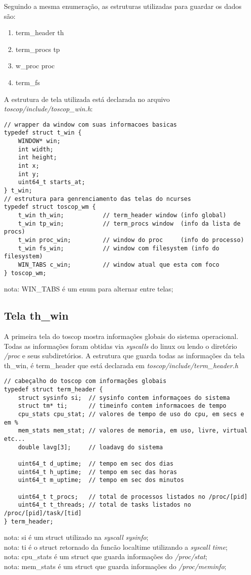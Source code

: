 \documentclass{article}
\begin{document}
Seguindo a mesma enumeração, as estruturas utilizadas para guardar os dados são:
\begin{enumerate}
    \item term\_header th 
    \item term\_procs tp
    \item w\_proc proc
    \item term\_fs
\end{enumerate}
A estrutura de tela utilizada está declarada no arquivo 
\textit{toscop/include/toscop\_win.h}:
\begin{verbatim}
// wrapper da window com suas informacoes basicas
typedef struct t_win {
    WINDOW* win;
    int width;
    int height;
    int x;
    int y;
    uint64_t starts_at;
} t_win;
// estrutura para genrenciamento das telas do ncurses
typedef struct toscop_wm {
    t_win th_win;           // term_header window (info global)
    t_win tp_win;           // term_procs window  (info da lista de procs)
    t_win proc_win;         // window do proc     (info do processo)
    t_win fs_win;           // window com filesystem (info do filesystem) 
    WIN_TABS c_win;         // window atual que esta com foco
} toscop_wm;
\end{verbatim}
nota: WIN\_TABS é um enum para alternar entre telas;

\subsection{Tela th\_win}
A primeira tela do toscop mostra informações globais do sistema 
operacional. Todas as informações foram obtidas via \textit{syscalls}
do linux ou lendo o diretório \textit{/proc} e seus subdiretórios. A 
estrutura que guarda todas as informações da tela th\_win, é term\_header
que está declarada em \textit{toscop/include/term\_header.h} 

\begin{verbatim}
// cabeçalho do toscop com informações globais
typedef struct term_header {
    struct sysinfo si;  // sysinfo contem informaçoes do sistema
    struct tm* ti;      // timeinfo contem informacoes de tempo
    cpu_stats cpu_stat; // valores de tempo de uso do cpu, em secs e em %
    mem_stats mem_stat; // valores de memoria, em uso, livre, virtual etc...
    double lavg[3];     // loadavg do sistema

    uint64_t d_uptime;  // tempo em sec dos dias
    uint64_t h_uptime;  // tempo em sec das horas
    uint64_t m_uptime;  // tempo em sec dos minutos

    uint64_t t_procs;   // total de processos listados no /proc/[pid]
    uint64_t t_threads; // total de tasks listados no /proc/[pid]/task/[tid]
} term_header;
\end{verbatim}
nota: si é um struct utilizado na \textit{syscall sysinfo};\\
nota: ti é o struct retornado da funcão localtime utilizando a \textit{syscall time};\\
nota: cpu\_stats é um struct que guarda informações do \textit{/proc/stat};\\
nota: mem\_stats é um struct que guarda informações do \textit{/proc/meminfo};
\end{document}

